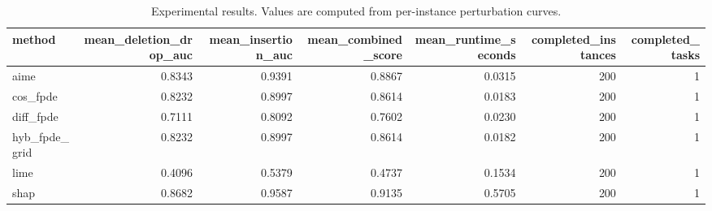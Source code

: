 \begin{table}[t]
\caption{Experimental results. Values are computed from per-instance perturbation curves.}
\label{tab:main_results_computed}
\centering
\begin{tabular}{lrrrrrr}
\toprule
method & mean\_deletion\_drop\_auc & mean\_insertion\_auc & mean\_combined\_score & mean\_runtime\_seconds & completed\_instances & completed\_tasks \\
\midrule
aime & 0.8343 & 0.9391 & 0.8867 & 0.0315 & 200 & 1 \\
cos\_fpde & 0.8232 & 0.8997 & 0.8614 & 0.0183 & 200 & 1 \\
diff\_fpde & 0.7111 & 0.8092 & 0.7602 & 0.0230 & 200 & 1 \\
hyb\_fpde\_grid & 0.8232 & 0.8997 & 0.8614 & 0.0182 & 200 & 1 \\
lime & 0.4096 & 0.5379 & 0.4737 & 0.1534 & 200 & 1 \\
shap & 0.8682 & 0.9587 & 0.9135 & 0.5705 & 200 & 1 \\
\bottomrule
\end{tabular}

\end{table}
